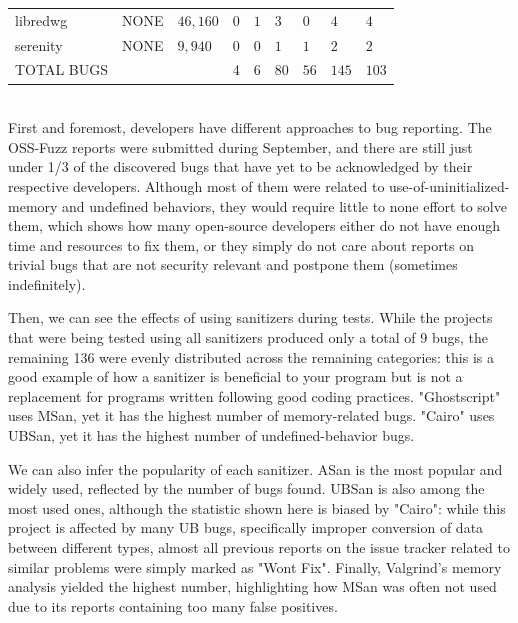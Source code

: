 \begin{adjustbox}{width=\textwidth,center}
\begin{tabular}{|l|l|l|l|l|l|l|l|l|}
libredwg         & NONE                & $46,160$            & $0$              & $1$           & $3$           & $0$            & $4$             & $4$                 \\
serenity         & NONE                & $9,940$             & $0$              & $0$           & $1$           & $1$            & $2$             & $2$                 \\
\hline
TOTAL BUGS   &   &   &$4$   &$6$   &$80$   &$56$   &$145$   &$103$       \\
\hline
\end{tabular}
\end{adjustbox}{}
\ \\ 

First and foremost, developers have different approaches to bug reporting. The OSS-Fuzz reports were submitted during September, and there are still just under 1/3 of the discovered bugs that have yet to be acknowledged by their respective developers. Although most of them were related to use-of-uninitialized-memory and undefined behaviors, they would require little to none effort to solve them, which shows how many open-source developers either do not have enough time and resources to fix them, or they simply do not care about reports on trivial bugs that are not security relevant and postpone them (sometimes indefinitely).

Then, we can see the effects of using sanitizers during tests. While the projects that were being tested using all sanitizers produced only a total of 9 bugs, the remaining 136 were evenly distributed across the remaining categories: this is a good example of how a sanitizer is beneficial to your program but is not a replacement for programs written following good coding practices. "Ghostscript" uses MSan, yet it has the highest number of memory-related bugs. "Cairo" uses UBSan, yet it has the highest number of undefined-behavior bugs.

We can also infer the popularity of each sanitizer. ASan is the most popular and widely used, reflected by the number of bugs found. UBSan is also among the most used ones, although the statistic shown here is biased by "Cairo": while this project is affected by many UB bugs, specifically improper conversion of data between different types, almost all previous reports on the issue tracker related to similar problems were simply marked as "Wont Fix". Finally, Valgrind's memory analysis yielded the highest number, highlighting how MSan was often not used due to its reports containing too many false positives.

